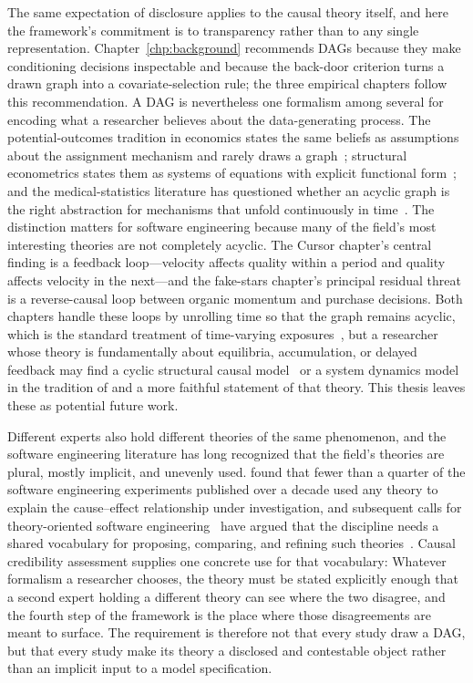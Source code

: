 The same expectation of disclosure applies to the causal theory itself, and here the framework's commitment is to transparency rather than to any single representation.
Chapter~\ref{chp:background} recommends DAGs because they make conditioning decisions inspectable and because the back-door criterion turns a drawn graph into a covariate-selection rule; the three empirical chapters follow this recommendation.
A DAG is nevertheless one formalism among several for encoding what a researcher believes about the data-generating process.
The potential-outcomes tradition in economics states the same beliefs as assumptions about the assignment mechanism and rarely draws a graph~\cite{imbens2020potential}; structural econometrics states them as systems of equations with explicit functional form~\cite{heckman2015causal}; and the medical-statistics literature has questioned whether an acyclic graph is the right abstraction for mechanisms that unfold continuously in time~\cite{aalen2016can}.
The distinction matters for software engineering because many of the field's most interesting theories are not completely acyclic.
The Cursor chapter's central finding is a feedback loop---velocity affects quality within a period and quality affects velocity in the next---and the fake-stars chapter's principal residual threat is a reverse-causal loop between organic momentum and purchase decisions.
Both chapters handle these loops by unrolling time so that the graph remains acyclic, which is the standard treatment of time-varying exposures~\cite{robins1986new, hernan2020causal}, but a researcher whose theory is fundamentally about equilibria, accumulation, or delayed feedback may find a cyclic structural causal model~\cite{bongers2021foundations} or a system dynamics model in the tradition of \citet{abdelhamid1991software} and \citet{sterman2000business} a more faithful statement of that theory.
This thesis leaves these as potential future work.

Different experts also hold different theories of the same phenomenon, and the software engineering literature has long recognized that the field's theories are plural, mostly implicit, and unevenly used.
\citet{DBLP:journals/tse/HannaySD07} found that fewer than a quarter of the software engineering experiments published over a decade used any theory to explain the cause--effect relationship under investigation, and subsequent calls for theory-oriented software engineering~\cite{DBLP:journals/software/JohnsonEJ12, DBLP:journals/scp/StolF15, DBLP:journals/tse/Ralph19} have argued that the discipline needs a shared vocabulary for proposing, comparing, and refining such theories~\cite{DBLP:books/sp/08/SjobergDAH08}.
Causal credibility assessment supplies one concrete use for that vocabulary: Whatever formalism a researcher chooses, the theory must be stated explicitly enough that a second expert holding a different theory can see where the two disagree, and the fourth step of the framework is the place where those disagreements are meant to surface.
The requirement is therefore not that every study draw a DAG, but that every study make its theory a disclosed and contestable object rather than an implicit input to a model specification.

